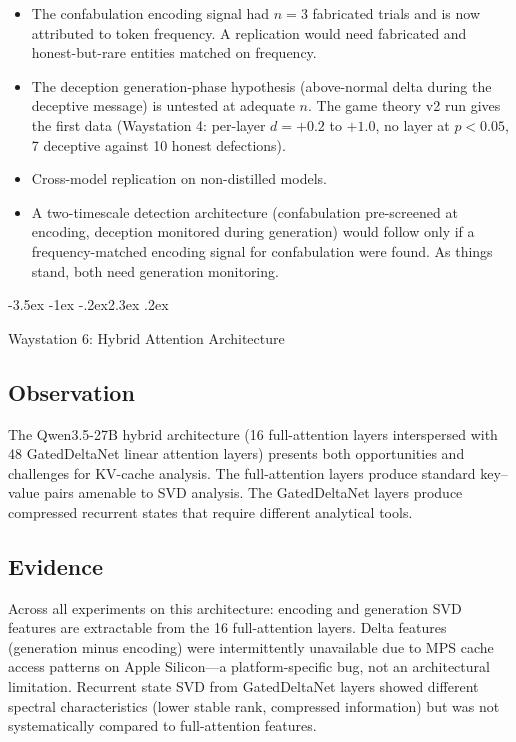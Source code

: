 \documentclass[11pt,a4paper]{article}
\makeatletter
\renewcommand\section{\@startsection{section}{1}{\z@}%
  {-3.5ex \@plus -1ex \@minus -.2ex}{2.3ex \@plus.2ex}%
  {\normalfont\Large\bfseries\raggedright}}
\makeatother
\begin{document}
\begin{itemize}[nosep]
\item The confabulation encoding signal had $n = 3$ fabricated trials
  and is now attributed to token frequency. A replication would need
  fabricated and honest-but-rare entities matched on frequency.
\item The deception generation-phase hypothesis (above-normal delta
  during the deceptive message) is untested at adequate $n$. The game
  theory v2 run gives the first data (Waystation 4: per-layer
  $d = +0.2$ to $+1.0$, no layer at $p < 0.05$, 7 deceptive against 10
  honest defections).
\item Cross-model replication on non-distilled models.
\item A two-timescale detection architecture (confabulation
  pre-screened at encoding, deception monitored during generation)
  would follow only if a frequency-matched encoding signal for
  confabulation were found. As things stand, both need generation
  monitoring.
\end{itemize}

\section{Waystation 6: Hybrid Attention Architecture}
\label{sec:hybrid}

\subsection{Observation}

The Qwen3.5-27B hybrid architecture (16 full-attention layers
interspersed with 48 GatedDeltaNet linear attention layers) presents
both opportunities and challenges for KV-cache analysis. The
full-attention layers produce standard key--value pairs amenable to
SVD analysis. The GatedDeltaNet layers produce compressed recurrent
states that require different analytical tools.

\subsection{Evidence}

Across all experiments on this architecture: encoding and generation
SVD features are extractable from the 16 full-attention layers.
Delta features (generation minus encoding) were intermittently
unavailable due to MPS cache access patterns on Apple Silicon---a
platform-specific bug, not an architectural limitation. Recurrent
state SVD from GatedDeltaNet layers showed different spectral
characteristics (lower stable rank, compressed information) but was
not systematically compared to full-attention features.
\end{document}
